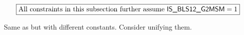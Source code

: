 \[
	\boxed{\text{All constraints in this subsection further assume } \textsf{IS\_BLS12\_G2MSM} = 1}
\]

Same as \oobInstBlsGOneMsm{} but with different constants. Consider unifying them.
